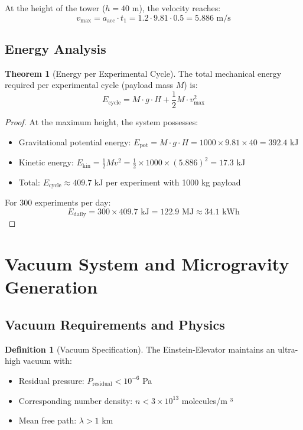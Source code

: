 ﻿\documentclass[a4paper,12pt]{article}
\theoremstyle{definition}
\newtheorem{definition}{Definition}
\newtheorem{theorem}{Theorem}
\begin{document}
At the height of the tower ($h = 40$ m), the velocity reaches:
\[
v_{\text{max}} = a_{\text{acc}} \cdot t_1 = 1.2 \cdot 9.81 \cdot 0.5 = 5.886 \text{ m/s}
\]

\subsection{Energy Analysis}

\begin{theorem}[Energy per Experimental Cycle]
The total mechanical energy required per experimental cycle (payload mass $M$) is:
\[
E_{\text{cycle}} = M \cdot g \cdot H + \frac{1}{2} M \cdot v_{\text{max}}^2
\]
\end{theorem}

\begin{proof}
At the maximum height, the system possesses:
\begin{itemize}
	\item Gravitational potential energy: $E_{\text{pot}} = M \cdot g \cdot H = 1000 \times 9.81 \times 40 = 392.4$ kJ
	\item Kinetic energy: $E_{\text{kin}} = \frac{1}{2} M v^2 = \frac{1}{2} \times 1000 \times (5.886)^2 = 17.3$ kJ
	\item Total: $E_{\text{cycle}} \approx 409.7$ kJ per experiment with 1000 kg payload
\end{itemize}

For 300 experiments per day:
\[
E_{\text{daily}} = 300 \times 409.7 \text{ kJ} = 122.9 \text{ MJ} \approx 34.1 \text{ kWh}
\]
\qedhere
\end{proof}

\section{Vacuum System and Microgravity Generation}
\label{sec:vacuum}

\subsection{Vacuum Requirements and Physics}

\begin{definition}[Vacuum Specification]
The Einstein-Elevator maintains an ultra-high vacuum with:
\begin{itemize}
	\item Residual pressure: $P_{\text{residual}} < 10^{-6}$ Pa
	\item Corresponding number density: $n < 3 \times 10^{13}$ molecules/m ³
	\item Mean free path: $\lambda > 1$ km
\end{itemize}
\end{definition}
\end{document}
